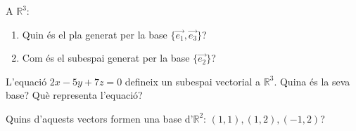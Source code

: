 \documentclass{beamer}
\begin{document}
\begin{frame}
  \begin{exercise}{}{}
    A $\mathbb{R}^3$:
    \begin{enumerate}
      \item Quin és el pla generat per la base $\{\overrightarrow{e_1},\overrightarrow{e_3}\}$?
      \item Com és el subespai generat per la base $\{\overrightarrow{e_2}\}$?
    \end{enumerate}
  \end{exercise}

  \begin{exercise}{}{}
    L'equació $2x-5y+7z=0$ defineix un subespai vectorial a $\mathbb{R}^3$. Quina és la seva base? Què representa l'equació?
  \end{exercise}

  \begin{exercise}{}{}
    Quins d'aquests vectors formen una base d'$\mathbb{R}^2$: $(1,1),(1,2),(-1,2)$?
  \end{exercise}

\end{frame}
\end{document}
